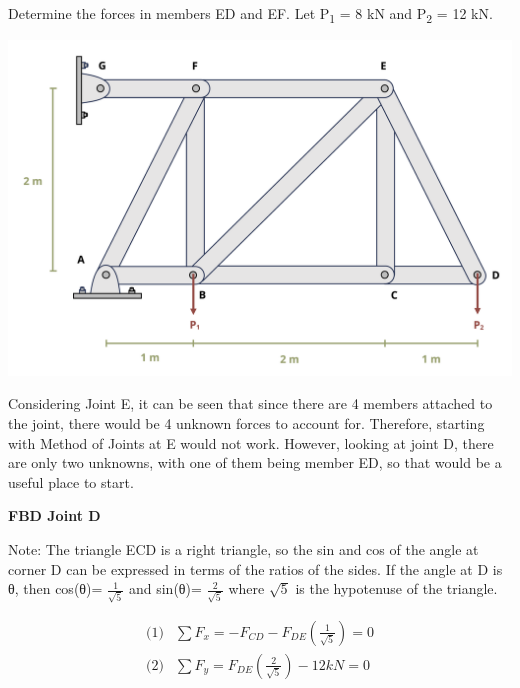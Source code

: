 \documentclass[
  letterpaper,
  DIV=11,
  numbers=noendperiod]{scrreprt}
\begin{document}
\begin{tcolorbox}[enhanced jigsaw, colbacktitle=quarto-callout-note-color!10!white, title={Example 1.4}, coltitle=black, leftrule=.75mm, rightrule=.15mm, opacityback=0, breakable, colframe=quarto-callout-note-color-frame, left=2mm, arc=.35mm, colback=white, bottomrule=.15mm, bottomtitle=1mm, toptitle=1mm, titlerule=0mm, opacitybacktitle=0.6, toprule=.15mm]

Determine the forces in members ED and EF. Let P\textsubscript{1} = 8 kN
and P\textsubscript{2} = 12 kN.

\begin{center}
\includegraphics{images/CH1 PNGs/example 1.4 part 1.png}
\end{center}

Considering Joint E, it can be seen that since there are 4 members
attached to the joint, there would be 4 unknown forces to account for.
Therefore, starting with Method of Joints at E would not work. However,
looking at joint D, there are only two unknowns, with one of them being
member ED, so that would be a useful place to start.

\textbf{FBD Joint D}

Note: The triangle ECD is a right triangle, so the sin and cos of the
angle at corner D can be expressed in terms of the ratios of the sides.
If the angle at D is θ, then cos(θ)= \(\frac{1}{\sqrt{5}}\) and sin(θ)=
\(\frac{2}{\sqrt{5}}\) where \(\sqrt{5}\) is the hypotenuse of the
triangle.

\[
\begin{aligned}
\text{(1)} & \sum F_x=-F_{C D}-F_{D E}\left(\frac{1}{\sqrt{5}}\right)=0 \\
\text{(2)} & \sum F_y=F_{D E}\left(\frac{2}{\sqrt{5}}\right)-12 k N=0
\end{aligned}
\]


\end{tcolorbox}
\end{document}
